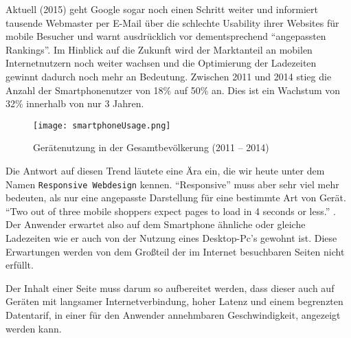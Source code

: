 		Aktuell (2015) geht Google sogar noch einen Schritt weiter und informiert tausende Webmaster per E-Mail über die schlechte Usability ihrer Websites für mobile Besucher und warnt ausdrücklich vor dementsprechend "`angepassten Rankings"'.\autocite{t3n15}
		Im Hinblick auf die Zukunft wird der Marktanteil an mobilen Internetnutzern noch weiter wachsen und die Optimierung der Ladezeiten gewinnt dadurch noch mehr an Bedeutung. Zwischen 2011 und 2014 stieg die Anzahl der Smartphonenutzer von 18\% auf 50\% an. Dies ist ein Wachstum von 32\% innerhalb von nur 3 Jahren.\autocite{tns14}\\

		\begin{figure}[htbp]
			\begin{center}
				\texttt{[image: smartphoneUsage.png]}
			\end{center}
			\caption{Gerätenutzung in der Gesamtbevölkerung (2011 – 2014)\autocite{tns14}}
			\label{fig:geraetenutzung}
		\end{figure}

		Die Antwort auf diesen Trend läutete eine Ära ein, die wir heute unter dem Namen \texttt{Responsive Webdesign} kennen. "`Responsive"' muss aber sehr viel mehr bedeuten, als nur eine angepasste Darstellung für eine bestimmte Art von Gerät. "`Two out of three mobile shoppers expect pages to load in 4 seconds or less."' \autocite{radware13}. Der Anwender erwartet also auf dem Smartphone ähnliche oder gleiche Ladezeiten wie er auch von der Nutzung eines Desktop-Pc's gewohnt ist. Diese Erwartungen werden von dem Großteil der im Internet besuchbaren Seiten nicht erfüllt. 


		Der Inhalt einer Seite muss darum so aufbereitet werden, dass dieser auch auf Geräten mit langsamer Internetverbindung, hoher Latenz und einem begrenzten Datentarif, in einer für den Anwender annehmbaren Geschwindigkeit, angezeigt werden kann.\\



